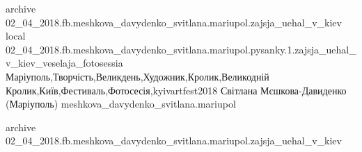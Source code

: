  
 
 
 
 

archive 02_04_2018.fb.meshkova_davydenko_svitlana.mariupol.zajsja_uehal_v_kiev
local 02_04_2018.fb.meshkova_davydenko_svitlana.mariupol.pysanky.1.zajsja_uehal_v_kiev_veselaja_fotosessia
Маріуполь,Творчість,Великдень,Художник,Кролик,Великодній Кролик,Київ,Фестиваль,Фотосесія,kyivartfest2018
Світлана Мєшкова-Давиденко (Маріуполь)
meshkova_davydenko_svitlana.mariupol

archive 02_04_2018.fb.meshkova_davydenko_svitlana.mariupol.zajsja_uehal_v_kiev
